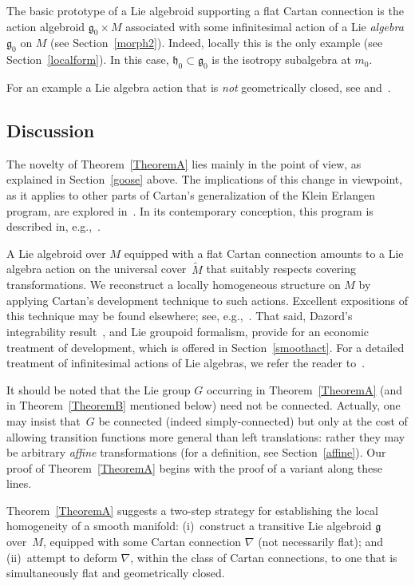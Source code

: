 \documentclass[pdftex]{sigma}
\numberwithin{equation}{section}
\begin{document}
The basic prototype of a Lie algebroid supporting a f\/lat Cartan
connection is the action algebroid ${\mathfrak g}_0 \times M$
associated with some inf\/initesimal action of a Lie {\em algebra}
${\mathfrak g}_0$ on $M$ (see Section~\ref{morph2}). Indeed, locally this is
the only example (see Section~\ref{localform}). In this case, ${\mathfrak
  h}_0 \subset {\mathfrak g}_0$ is the isotropy subalgebra at $m_0$.

For an example a Lie algebra action that is {\em not} geometrically
closed, see \cite[Example~8]{Kamber_Michor_04} and~\cite{Kowalski_97}.


\subsection{Discussion}
The novelty of Theorem~\ref{TheoremA} lies mainly in the point of view, as
explained in Section~\ref{goose} above. The implications of this change in
viewpoint, as it applies to other parts of Cartan's generalization of
the Klein Erlangen program, are explored in~\cite{Blaom_12}. In its
contemporary conception, this program is described in, e.g.,~\cite{Sharpe_97}.

A Lie algebroid over $M$ equipped with a f\/lat Cartan connection
amounts to a Lie algebra action on the universal cover~$\tilde M$ that
suitably respects covering transformations. We reconstruct a locally
homogeneous structure on $M$ by applying Cartan's development
technique to such actions. Excellent expositions of this technique may
be found elsewhere; see, e.g.,~\cite{Sharpe_97}. That said, Dazord's
integrability result~\cite{Dazord_97}, and Lie groupoid formalism,
provide for an economic treatment of development, which is of\/fered in
Section~\ref{smoothact}.  For a detailed treatment of inf\/initesimal actions
of Lie algebras, we refer the reader to~\cite{Alekseevsky_Michor_95b,Kamber_Michor_04}.

It should be noted that the Lie group $G$ occurring in Theorem~\ref{TheoremA} (and
in Theorem~\ref{TheoremB} mentioned below) need not be connected. Actually, one may
insist that~$G$ be connected (indeed simply-connected) but only at the
cost of allowing transition functions more general than left
translations: rather they may be arbitrary {\em affine}
transformations (for a def\/inition, see Section~\ref{affine}). Our proof of
Theorem~\ref{TheoremA} begins with the proof of a variant along these lines.

Theorem~\ref{TheoremA} suggests a two-step strategy for establishing the local
homogeneity of a smooth manifold: (i)~construct a transitive Lie
algebroid ${\mathfrak g} $ over~$M$, equipped with some Cartan
connection $\nabla$ (not necessarily f\/lat); and (ii)~attempt to deform
$\nabla$, within the class of Cartan connections, to one that is
simultaneously f\/lat and geometrically closed.
\end{document}
